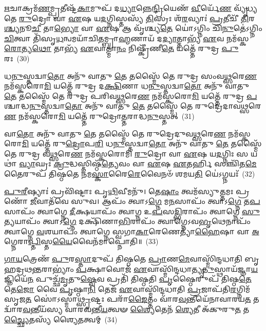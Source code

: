 \-\ul{𑌋}\-𑌚𑌾𑌕𑍍𑌰𑌮᳴\-\ul{𑌣}\-𑌮𑍍𑌪𑍍𑌰𑌤𑍀𑌷𑍍𑌟᳴\-\ul{𑌕𑌾}\-𑌮𑍁𑌪᳴ 𑌦\-\ul{𑌧𑍍𑌯𑌾}\-𑌨𑍍𑌨𑍇\-\ul{𑌨𑍍𑌦𑍍𑌰𑌿}\-𑌯𑍇𑌣᳴ \ul{𑌵𑍀}\-𑌰𑍍𑌯𑍇᳴\-\ul{𑌣} 𑌵𑍍𑌯𑍃᳴𑌧𑍍𑌯𑌤𑍇 \ul{𑌰𑍁}\-𑌦𑍍𑌰𑍋 𑌵𑌾 \ul{𑌏}\-𑌷 𑌯\-\ul{𑌦}\-𑌗𑍍𑌨𑌿𑌸𑍍𑌤𑌸𑍍𑌯᳴ \ul{𑌤𑌿}\-𑌸𑍍𑌰𑌃 𑌶᳴\-\ul{𑌰}\-𑌵𑍍𑌯𑌾𑌃॑ \ul{𑌪𑍍𑌰}\-𑌤𑍀𑌚𑍀᳴ \ul{𑌤𑌿}\-𑌰\-\ul{𑌶𑍍𑌚𑍍𑌯}\-𑌨𑍂\-\ul{𑌚𑍀} 𑌤𑌾\-\ul{𑌭𑍍𑌯𑍋} 𑌵𑌾 \ul{𑌏}\-𑌷 𑌆 𑌵𑍃᳴𑌶𑍍𑌚𑍍𑌯\-\ul{𑌤𑍇} 𑌯𑍋॑\-𑌽𑌗𑍍𑌨𑌿𑌂 𑌚𑌿᳴\-\ul{𑌨𑍁}\-𑌤𑍇॑\-𑌽𑌗𑍍𑌨𑌿𑌂 \ul{𑌚𑌿}\-𑌤𑍍𑌵𑌾 𑌤𑌿᳴𑌸𑍃\-\ul{𑌧}\-𑌨𑍍𑌵𑌮𑌯𑌾᳴𑌚𑌿𑌤𑌮𑍍𑌬𑍍𑌰𑌾\-\ul{𑌹𑍍𑌮}\-𑌣𑌾𑌯᳴ 𑌦\-\ul{𑌦𑍍𑌯𑌾}\-𑌤𑍍𑌤𑌾𑌭𑍍𑌯᳴ \ul{𑌏}\-𑌵 𑌨𑌮᳴𑌸𑍍𑌕\-\ul{𑌰𑍋}\-𑌤𑍍𑌯\-\ul{𑌥𑍋} 𑌤𑌾𑌭𑍍𑌯᳴ \ul{𑌏}\-𑌵𑌾𑌤𑍍𑌮𑌾\-\ul{𑌨𑌂} 𑌨𑌿𑌷𑍍𑌕𑍍𑌰𑍀᳴𑌣𑍀\-\ul{𑌤𑍇} 𑌯𑌤𑍍𑌤𑍇᳴ 𑌰𑍁𑌦𑍍𑌰 \ul{𑌪𑍁}\-𑌰𑌃~(30)

𑌧\-\ul{𑌨𑍁}\-𑌸𑍍𑌤𑌦𑍍𑌵𑌾\-\ul{𑌤𑍋} 𑌅𑌨𑍁᳴ 𑌵𑌾𑌤𑍁 \ul{𑌤𑍇} 𑌤𑌸𑍍𑌮𑍈᳴ 𑌤𑍇 𑌰𑍁𑌦𑍍𑌰 𑌸𑌂𑌵\-\ul{𑌥𑍍𑌸}\-𑌰𑍇\-\ul{𑌣} 𑌨𑌮᳴𑌸𑍍𑌕𑌰𑍋\-\ul{𑌮𑌿} 𑌯𑌤𑍍𑌤𑍇᳴ 𑌰𑍁𑌦𑍍𑌰 𑌦\-\ul{𑌕𑍍𑌷𑌿}\-𑌣𑌾 𑌧\-\ul{𑌨𑍁}\-𑌸𑍍𑌤𑌦𑍍𑌵𑌾\-\ul{𑌤𑍋} 𑌅𑌨𑍁᳴ 𑌵𑌾𑌤𑍁 \ul{𑌤𑍇} 𑌤𑌸𑍍𑌮𑍈᳴ 𑌤𑍇 𑌰𑍁𑌦𑍍𑌰 𑌪𑌰𑌿𑌵\-\ul{𑌥𑍍𑌸}\-𑌰𑍇\-\ul{𑌣} 𑌨𑌮᳴𑌸𑍍𑌕𑌰𑍋\-\ul{𑌮𑌿} 𑌯𑌤𑍍𑌤𑍇᳴ 𑌰𑍁𑌦𑍍𑌰 \ul{𑌪}\-𑌶𑍍𑌚𑌾𑌦𑍍𑌧\-\ul{𑌨𑍁}\-𑌸𑍍𑌤𑌦𑍍𑌵𑌾\-\ul{𑌤𑍋} 𑌅𑌨𑍁᳴ 𑌵𑌾𑌤𑍁 \ul{𑌤𑍇} 𑌤𑌸𑍍𑌮𑍈᳴ 𑌤𑍇 𑌰𑍁𑌦𑍍𑌰𑍇𑌦𑌾𑌵\-\ul{𑌥𑍍𑌸}\-𑌰𑍇\-\ul{𑌣} 𑌨𑌮᳴𑌸𑍍𑌕𑌰𑍋\-\ul{𑌮𑌿} 𑌯𑌤𑍍𑌤𑍇᳴ 𑌰𑍁𑌦𑍍𑌰𑍋\-\ul{𑌤𑍍𑌤}\-𑌰𑌾𑌦𑍍𑌧\-\ul{𑌨𑍁}\-𑌸𑍍𑌤𑌤𑍍~(31)

𑌵𑌾\-\ul{𑌤𑍋} 𑌅𑌨𑍁᳴ 𑌵𑌾𑌤𑍁 \ul{𑌤𑍇} 𑌤𑌸𑍍𑌮𑍈᳴ 𑌤𑍇 𑌰𑍁𑌦𑍍𑌰𑍇𑌦𑍁𑌵\-\ul{𑌥𑍍𑌸}\-𑌰𑍇\-\ul{𑌣} 𑌨𑌮᳴𑌸𑍍𑌕𑌰𑍋\-\ul{𑌮𑌿} 𑌯𑌤𑍍𑌤𑍇᳴ 𑌰𑍁\-\ul{𑌦𑍍𑌰𑍋}\-𑌪\-\ul{𑌰𑌿} 𑌧\-\ul{𑌨𑍁}\-𑌸𑍍𑌤𑌦𑍍𑌵𑌾\-\ul{𑌤𑍋} 𑌅𑌨𑍁᳴ 𑌵𑌾𑌤𑍁 \ul{𑌤𑍇} 𑌤𑌸𑍍𑌮𑍈᳴ 𑌤𑍇 𑌰𑍁𑌦𑍍𑌰 𑌵\-\ul{𑌥𑍍𑌸}\-𑌰𑍇\-\ul{𑌣} 𑌨𑌮᳴𑌸𑍍𑌕𑌰𑍋𑌮𑌿 \ul{𑌰𑍁}\-𑌦𑍍𑌰𑍋 𑌵𑌾 \ul{𑌏}\-𑌷 𑌯\-\ul{𑌦}\-𑌗𑍍𑌨𑌿𑌃 𑌸 𑌯𑌥𑌾॑ \ul{𑌵𑍍𑌯𑌾}\-𑌘𑍍𑌰𑌃 \ul{𑌕𑍍𑌰𑍁}\-𑌦𑍍𑌧𑌸𑍍𑌤𑌿𑌷𑍍𑌠᳴\-\ul{𑌤𑍍𑌯𑍇}\-𑌵𑌂 𑌵𑌾 \ul{𑌏}\-𑌷 \ul{𑌏}\-𑌤𑌰𑍍\mbox{}\-\ul{𑌹𑌿} 𑌸𑌞𑍍𑌚𑌿᳴𑌤\-\ul{𑌮𑍇}\-𑌤𑍈𑌰𑍁𑌪᳴ 𑌤𑌿𑌷𑍍𑌠𑌤𑍇 𑌨𑌮\-\ul{𑌸𑍍𑌕𑌾}\-𑌰𑍈\-\ul{𑌰𑍇}\-𑌵𑍈𑌨𑍞᳴ 𑌶𑌮𑌯\-\ul{𑌤𑌿} 𑌯𑍇॑\-𑌽𑌗𑍍𑌨𑌯𑌃᳴~(32)

\-\ul{𑌪𑍁}\-\-\ul{𑌰𑍀}\-𑌷𑍍𑌯𑌾𑌃॑ 𑌪𑍍𑌰𑌵𑌿᳴𑌷𑍍𑌟𑌾𑌃 𑌪𑍃\-\ul{𑌥𑌿}\-𑌵𑍀𑌮𑌨𑍁᳴। 𑌤𑍇\-\ul{𑌷𑌾𑌂} 𑌤𑍍𑌵𑌮᳴𑌸𑍍𑌯𑍁\-\ul{𑌤𑍍𑌤}\-𑌮𑌃 𑌪𑍍𑌰 𑌣𑍋᳴ \ul{𑌜𑍀}\-𑌵𑌾𑌤᳴𑌵𑍇 𑌸𑍁𑌵। 𑌆𑌪𑌂᳴ 𑌤𑍍𑌵𑌾𑌽\-\ul{𑌗𑍍𑌨𑍇} 𑌮\-\ul{𑌨}\-𑌸𑌾𑌪𑌂᳴ 𑌤𑍍𑌵𑌾𑌽\-\ul{𑌗𑍍𑌨𑍇} 𑌤\-\ul{𑌪}\-𑌸𑌾𑌪𑌂᳴ 𑌤𑍍𑌵𑌾𑌗𑍍𑌨𑍇 \ul{𑌦𑍀}\-𑌕𑍍𑌷𑌯𑌾𑌪𑌂᳴ 𑌤𑍍𑌵𑌾𑌗𑍍𑌨 𑌉\-\ul{𑌪}\-𑌸\-\ul{𑌦𑍍𑌭𑌿}\-𑌰𑌾𑌪𑌂᳴ 𑌤𑍍𑌵𑌾𑌗𑍍𑌨𑍇 \ul{𑌸𑍁}\-𑌤𑍍𑌯𑌯𑌾𑌪𑌂᳴ 𑌤𑍍𑌵𑌾𑌽\-\ul{𑌗𑍍𑌨𑍇} 𑌦𑌕𑍍𑌷𑌿᳴𑌣𑌾\-\ul{𑌭𑌿}\-𑌰𑌾𑌪𑌂᳴ 𑌤𑍍𑌵𑌾𑌗𑍍𑌨𑍇\-𑌽𑌵\-\ul{𑌭𑍃}\-𑌥𑍇𑌨𑌾𑌪𑌂᳴ 𑌤𑍍𑌵𑌾𑌗𑍍𑌨𑍇 \ul{𑌵}\-𑌶𑌯𑌾𑌪𑌂᳴ 𑌤𑍍𑌵𑌾𑌗𑍍𑌨𑍇 𑌸𑍍𑌵𑌗𑌾\-\ul{𑌕𑌾}\-𑌰𑍇𑌣𑍇𑌤𑍍𑌯𑌾᳴\-\ul{𑌹𑍈}\-𑌷𑌾 𑌵𑌾 \ul{𑌅}\-𑌗𑍍𑌨𑍇𑌰𑌾\-\ul{𑌪𑍍𑌤𑌿}\-𑌸𑍍𑌤\-\ul{𑌯𑍈}\-𑌵𑍈𑌨᳴𑌮𑌾𑌪𑍍𑌨𑍋𑌤𑌿॥~(33)

{\anuvakamend[{\-\ul{𑌐}\-\-\ul{𑌨𑍍𑌦𑍍𑌰𑌿}\-𑌯𑌾 \ul{𑌪𑍁}\-𑌰 𑌉᳴\-\ul{𑌤𑍍𑌤}\-𑌰𑌾𑌦𑍍𑌧\-\ul{𑌨𑍁}\-𑌸𑍍𑌤\-\ul{𑌦}\-𑌗𑍍𑌨𑌯᳴ 𑌆\-\ul{𑌹𑌾}\-𑌷𑍍𑌟𑍗 𑌚᳴}]}%

\-\ul{𑌗𑌾}\-\-\ul{𑌯}\-𑌤𑍍𑌰𑍇𑌣᳴ \ul{𑌪𑍁}\-𑌰\-\ul{𑌸𑍍𑌤𑌾}\-𑌦𑍁𑌪᳴ 𑌤𑌿𑌷𑍍𑌠𑌤𑍇 \ul{𑌪𑍍𑌰𑌾}\-𑌣\-\ul{𑌮𑍇}\-𑌵𑌾𑌸𑍍𑌮𑌿᳴𑌨𑍍𑌦𑌧𑌾𑌤𑌿 𑌬𑍃𑌹𑌦𑍍𑌰𑌥\-\ul{𑌨𑍍𑌤}\-𑌰𑌾\-𑌭𑍍𑌯𑌾𑌂॑ \ul{𑌪}\-𑌕𑍍𑌷𑌾𑌵𑍋𑌜᳴ \ul{𑌏}\-𑌵𑌾𑌸𑍍𑌮𑌿᳴𑌨𑍍𑌦𑌧𑌾𑌤𑍍𑌯𑍃\-\ul{𑌤𑍁}\-𑌸𑍍𑌥𑌾𑌯᳴𑌜𑍍𑌞𑌾\-\ul{𑌯}\-𑌜𑍍𑌞𑌿𑌯𑍇᳴\-\ul{𑌨} 𑌪𑍁𑌚𑍍𑌛᳴\-\ul{𑌮𑍃}\-𑌤𑍁\-\ul{𑌷𑍍𑌵𑍇}\-𑌵 𑌪𑍍𑌰𑌤𑌿᳴ 𑌤𑌿𑌷𑍍𑌠𑌤𑌿 \ul{𑌪𑍃}\-𑌷𑍍𑌠𑍈𑌰𑍁𑌪᳴ 𑌤𑌿𑌷𑍍𑌠\-\ul{𑌤𑍇} 𑌤𑍇\-\ul{𑌜𑍋} 𑌵𑍈 \ul{𑌪𑍃}\-𑌷𑍍𑌠𑌾\-\ul{𑌨𑌿} 𑌤𑍇𑌜᳴ \ul{𑌏}\-𑌵𑌾𑌸𑍍𑌮𑌿᳴𑌨𑍍𑌦𑌧𑌾𑌤𑌿 \ul{𑌪𑍍𑌰}\-𑌜𑌾𑌪᳴𑌤𑌿\-\ul{𑌰}\-𑌗𑍍𑌨𑌿𑌮᳴𑌸𑍃𑌜\-\ul{𑌤} 𑌸𑍋॑\-𑌽𑌸𑍍𑌮𑌾\-\ul{𑌥𑍍𑌸𑍃}\-𑌷𑍍𑌟𑌃 𑌪𑌰𑌾᳴\-\ul{𑌙𑍈}\-𑌤𑍍𑌤𑌂 𑌵𑌾᳴𑌰\-\ul{𑌵}\-𑌨𑍍𑌤𑍀𑌯𑍇᳴𑌨𑌾𑌵𑌾𑌰𑌯\-\ul{𑌤} 𑌤𑌦𑍍𑌵𑌾᳴𑌰\-\ul{𑌵}\-𑌨𑍍𑌤𑍀𑌯᳴𑌸𑍍𑌯 𑌵𑌾𑌰𑌵𑌨𑍍𑌤𑍀\-\ul{𑌯}\-𑌤𑍍𑌵𑍟 \ul{𑌶𑍍𑌯𑍈}\-𑌤𑍇𑌨᳴ \ul{𑌶𑍍𑌯𑍇}\-𑌤𑍀 𑌅᳴𑌕𑍁𑌰𑍁\-\ul{𑌤} 𑌤\-\ul{𑌚𑍍𑌛𑍍𑌯𑍈}\-𑌤𑌸𑍍𑌯᳴ 𑌶𑍍𑌯𑍈\-\ul{𑌤}\-𑌤𑍍𑌵𑌮𑍍~(34)

